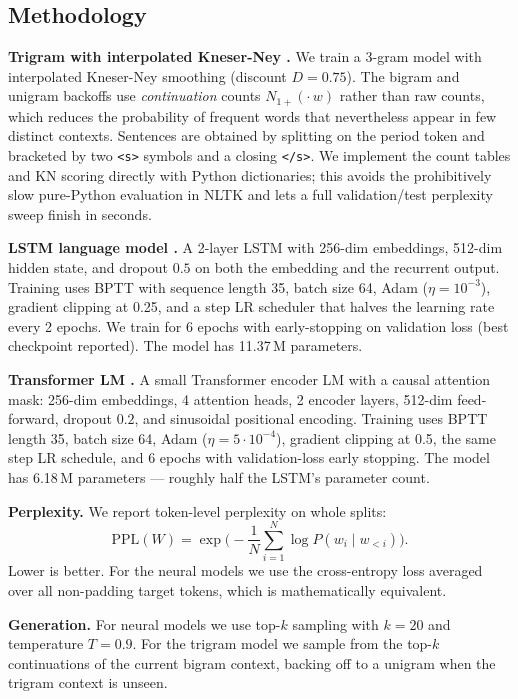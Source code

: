 \subsection{Methodology}

\textbf{Trigram with interpolated Kneser-Ney \citep{KneserNey1995,ChenGoodman1999smoothing}.} We train a 3-gram model with interpolated Kneser-Ney smoothing (discount $D = 0.75$). The bigram and unigram backoffs use \emph{continuation} counts $N_{1+}(\cdot\, w)$ rather than raw counts, which reduces the probability of frequent words that nevertheless appear in few distinct contexts. Sentences are obtained by splitting on the period token and bracketed by two \texttt{<s>} symbols and a closing \texttt{</s>}. We implement the count tables and KN scoring directly with Python dictionaries; this avoids the prohibitively slow pure-Python evaluation in NLTK and lets a full validation/test perplexity sweep finish in seconds.

\textbf{LSTM language model \citep{Hochreiter1997lstm}.} A 2-layer LSTM with 256-dim embeddings, 512-dim hidden state, and dropout $0.5$ on both the embedding and the recurrent output. Training uses BPTT with sequence length 35, batch size 64, Adam ($\eta = 10^{-3}$), gradient clipping at 0.25, and a step LR scheduler that halves the learning rate every 2 epochs. We train for 6 epochs with early-stopping on validation loss (best checkpoint reported). The model has 11.37\,M parameters.

\textbf{Transformer LM \citep{Vaswani2017attention}.} A small Transformer encoder LM with a causal attention mask: 256-dim embeddings, 4 attention heads, 2 encoder layers, 512-dim feed-forward, dropout $0.2$, and sinusoidal positional encoding. Training uses BPTT length 35, batch size 64, Adam ($\eta = 5 \cdot 10^{-4}$), gradient clipping at 0.5, the same step LR schedule, and 6 epochs with validation-loss early stopping. The model has 6.18\,M parameters --- roughly half the LSTM's parameter count.

\textbf{Perplexity.} We report token-level perplexity on whole splits:
$$
\mathrm{PPL}(W) = \exp\!\Bigg(-\frac{1}{N}\sum_{i=1}^{N} \log P(w_i \mid w_{<i})\Bigg).
$$
Lower is better. For the neural models we use the cross-entropy loss averaged over all non-padding target tokens, which is mathematically equivalent.

\textbf{Generation.} For neural models we use top-$k$ sampling with $k = 20$ and temperature $T = 0.9$. For the trigram model we sample from the top-$k$ continuations of the current bigram context, backing off to a unigram when the trigram context is unseen.

